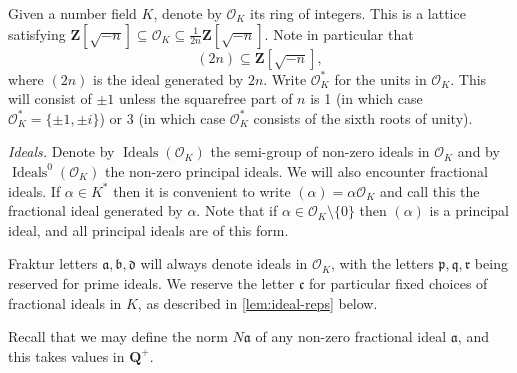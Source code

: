 \documentclass[11pt,reqno]{amsart}
\numberwithin{equation}{section}
\theoremstyle{definition}
\theoremstyle{remark}
\newcommand{\mf}{\mathfrak}
\newcommand\Z{\mathbf{Z}}
\newcommand\Q{\mathbf{Q}}
\newcommand\Ideals{\operatorname{Ideals}}
\renewcommand\O{\mathcal{O}}
\begin{document}
Given a number field $K$, denote by $\O_K$ its ring of integers. This is a lattice satisfying $\Z[\sqrt{-n}] \subseteq \O_K \subseteq \frac{1}{2n}\Z[\sqrt{-n}]$. Note in particular that 
\begin{equation}\label{int-contain} (2n) \subseteq \Z[\sqrt{-n}],\end{equation} where $(2n)$ is the ideal generated by $2n$. Write $\O^*_K$ for the units in $\O_K$. This will consist of $\pm 1$ unless the squarefree part of $n$ is 1 (in which case $\O_K^* = \{ \pm 1, \pm i\}$) or $3$ (in which case $\O_K^*$ consists of the sixth roots of unity).\vspace*{8pt}

\emph{Ideals.} Denote by $\Ideals(\O_K)$ the semi-group of non-zero ideals in $\O_K$ and by $\Ideals^0(\O_K)$ the non-zero principal ideals. We will also encounter fractional ideals. If $\alpha \in K^*$ then it is convenient to write $(\alpha) = \alpha \O_K$ and call this the fractional ideal generated by $\alpha$. Note that if $\alpha \in \O_K \setminus \{0\}$ then $(\alpha)$ is a principal ideal, and all principal ideals are of this form. 

Fraktur letters $\mf{a}, \mf{b},\mf{d}$ will always denote ideals in $\O_K$, with the letters $\mf{p}, \mf{q},\mf{r}$ being reserved for prime ideals. We reserve the letter $\mf{c}$ for particular fixed choices of fractional ideals in $K$, as described in \cref{lem:ideal-reps} below.

Recall that we may define the norm $N\mf{a}$ of any non-zero fractional ideal $\mf{a}$, and this takes values in $\Q^+$.
\end{document}
